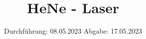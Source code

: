

\subject{V61}
\title{HeNe - Laser}
\date{%
  Durchführung: 08.05.2023
  \hspace{3em}
  Abgabe: 17.05.2023
}



\maketitle
\setcounter{page}{1}







\printbibliography{}


